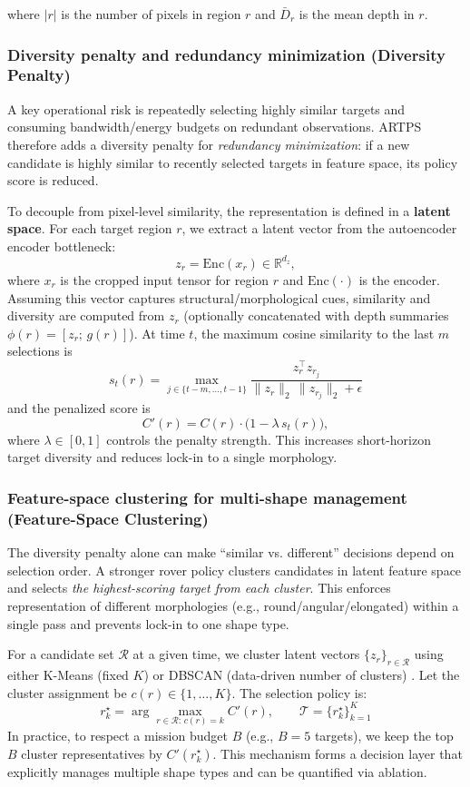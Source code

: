 \documentclass[12pt]{article}
\begin{document}
where \(|r|\) is the number of pixels in region \(r\) and \(\bar{D}_r\) is the mean depth in \(r\).

\subsubsection{Diversity penalty and redundancy minimization (Diversity Penalty)}
A key operational risk is repeatedly selecting highly similar targets and consuming bandwidth/energy budgets on redundant observations. ARTPS therefore adds a diversity penalty for \emph{redundancy minimization}: if a new candidate is highly similar to recently selected targets in feature space, its policy score is reduced.

To decouple from pixel-level similarity, the representation is defined in a \textbf{latent space}. For each target region \(r\), we extract a latent vector from the autoencoder encoder bottleneck:
\[
z_r=\mathrm{Enc}(x_r)\in\mathbb{R}^{d_z},
\]
where \(x_r\) is the cropped input tensor for region \(r\) and \(\mathrm{Enc}(\cdot)\) is the encoder. Assuming this vector captures structural/morphological cues, similarity and diversity are computed from \(z_r\) (optionally concatenated with depth summaries \(\phi(r)=[z_r;\,g(r)]\)). At time \(t\), the maximum cosine similarity to the last \(m\) selections is
\[
s_t(r)=\max_{j\in\{t-m,\dots,t-1\}} \frac{z_r^\top z_{r_j}}{\|z_r\|_2\,\|z_{r_j}\|_2+\epsilon}
\]
and the penalized score is
\[
C'(r)=C(r)\cdot\big(1-\lambda\, s_t(r)\big),
\]
where \(\lambda\in[0,1]\) controls the penalty strength. This increases short-horizon target diversity and reduces lock-in to a single morphology.

\subsubsection{Feature-space clustering for multi-shape management (Feature-Space Clustering)}
The diversity penalty alone can make “similar vs. different” decisions depend on selection order. A stronger rover policy clusters candidates in latent feature space and selects \emph{the highest-scoring target from each cluster}. This enforces representation of different morphologies (e.g., round/angular/elongated) within a single pass and prevents lock-in to one shape type.

For a candidate set \(\mathcal{R}\) at a given time, we cluster latent vectors \(\{z_r\}_{r\in\mathcal{R}}\) using either K-Means (fixed \(K\)) or DBSCAN (data-driven number of clusters) \cite{macqueen1967kmeans,ester1996dbscan}. Let the cluster assignment be \(c(r)\in\{1,\dots,K\}\). The selection policy is:
\[
r_k^\star=\arg\max_{r\in\mathcal{R}:\,c(r)=k} C'(r),\qquad
\mathcal{T}=\{r_k^\star\}_{k=1}^{K}
\]
In practice, to respect a mission budget \(B\) (e.g., \(B=5\) targets), we keep the top \(B\) cluster representatives by \(C'(r_k^\star)\). This mechanism forms a decision layer that explicitly manages multiple shape types and can be quantified via ablation.
\end{document}
